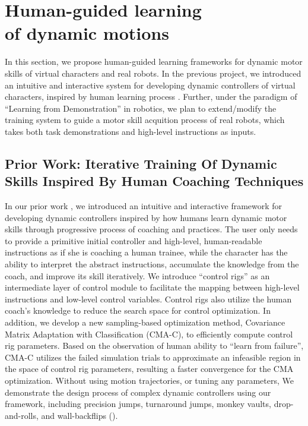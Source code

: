 \chapter{Human-guided learning \protect\\ of dynamic motions}

\indent

In this section, we propose human-guided learning frameworks for
dynamic motor skills of virtual characters and real robots.
In the previous project, we introduced an intuitive and 
interactive system for developing dynamic controllers 
of virtual characters,
inspired by human learning process \cite{fitts:1967:hp}.
Further, under the paradigm of ``Learning from Demonstration''
in robotics,
we plan to extend/modify the training system to guide 
a motor skill acquition process of real robots, which
takes both task demonstrations and high-level instructions as inputs.

\section{Prior Work: Iterative Training Of Dynamic Skills Inspired By Human Coaching Techniques}

\indent

In our prior work \cite{Ha:2014:ITD},
we introduced an intuitive and interactive framework for developing 
dynamic controllers inspired by how humans learn dynamic motor
skills through progressive process of coaching and practices. 
The user only needs to provide a primitive initial controller and
high-level, human-readable instructions as if
she is coaching a human trainee, while the character has the ability
to interpret the abstract instructions, accumulate the knowledge from
the coach, and improve its skill iteratively. We introduce ``control
rigs'' as an intermediate layer of control module to facilitate the
mapping between high-level instructions and low-level control
variables. Control rigs also utilize the human coach's knowledge to
reduce the search space for control optimization. In addition, we
develop a new sampling-based optimization method, Covariance Matrix
Adaptation with Classification (CMA-C), to efficiently compute control
rig parameters. Based on the observation of human ability to ``learn
from failure'', CMA-C utilizes the failed simulation trials to
approximate an infeasible region in the space of control rig
parameters, resulting a faster convergence for the CMA
optimization. 
Without using motion trajectories, or tuning any parameters,
We demonstrate the design process of complex dynamic
controllers using our framework, including precision jumps, turnaround
jumps, monkey vaults, drop-and-rolls, and wall-backflips 
().


